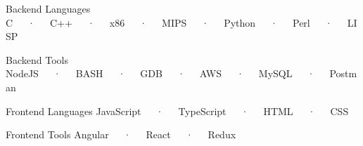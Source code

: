 
\begin{cvskills}
  \cvskill
    {Backend Languages}
    {C~~~·~~~C++~~~·~~~x86~~~·~~~MIPS~~~·~~~Python~~~·~~~Perl~~~·~~~LISP}
   
  \cvskill
    {Backend Tools}
    {NodeJS~~~·~~~BASH~~~·~~~GDB~~~·~~~AWS~~~·~~~MySQL~~~·~~~Postman}
    
   \cvskill
    {Frontend Languages}
    {JavaScript~~~·~~~TypeScript~~~·~~~HTML~~~·~~~CSS}
    
  \cvskill
    {Frontend Tools}
    {Angular~~~·~~~React~~~·~~~Redux}
\end{cvskills}
